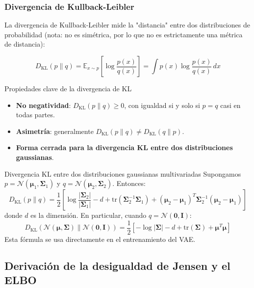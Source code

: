 \documentclass[a4paper]{article}
\begin{document}
\subsubsection{Divergencia de Kullback-Leibler}

La divergencia de Kullback-Leibler mide la "distancia" entre dos distribuciones de probabilidad (nota: no es simétrica, por lo que no es estrictamente una métrica de distancia):

$$D_{\mathrm{KL}}(p \| q) = \mathbb{E}_{x \sim p} \left[\log \frac{p(x)}{q(x)}\right] = \int p(x) \log \frac{p(x)}{q(x)} \, dx$$

\begin{importantbox}{Propiedades clave de la divergencia de KL}
\begin{itemize}
    \item \textbf{No negatividad}: $D_{\mathrm{KL}}(p \| q) \geq 0$, con igualdad si y solo si $p = q$ casi en todas partes.
    \item \textbf{Asimetría}: generalmente $D_{\mathrm{KL}}(p \| q) \neq D_{\mathrm{KL}}(q \| p)$.
    \item \textbf{Forma cerrada para la divergencia KL entre dos distribuciones gaussianas}.
\end{itemize}
\end{importantbox}

\begin{knowledgebox}{Divergencia KL entre dos distribuciones gaussianas multivariadas}
Supongamos $p = \mathcal{N}(\boldsymbol{\mu}_1, \boldsymbol{\Sigma}_1)$ y $q = \mathcal{N}(\boldsymbol{\mu}_2, \boldsymbol{\Sigma}_2)$. Entonces:
$$D_{\mathrm{KL}}(p \| q) = \frac{1}{2}\left[\log\frac{|\boldsymbol{\Sigma}_2|}{|\boldsymbol{\Sigma}_1|} - d + \mathrm{tr}(\boldsymbol{\Sigma}_2^{-1}\boldsymbol{\Sigma}_1) + (\boldsymbol{\mu}_2 - \boldsymbol{\mu}_1)^T \boldsymbol{\Sigma}_2^{-1} (\boldsymbol{\mu}_2 - \boldsymbol{\mu}_1)\right]$$
donde $d$ es la dimensión. En particular, cuando $q = \mathcal{N}(\mathbf{0}, \mathbf{I})$:
$$D_{\mathrm{KL}}(\mathcal{N}(\boldsymbol{\mu}, \boldsymbol{\Sigma}) \| \mathcal{N}(\mathbf{0}, \mathbf{I})) = \frac{1}{2}\left[-\log|\boldsymbol{\Sigma}| - d + \mathrm{tr}(\boldsymbol{\Sigma}) + \boldsymbol{\mu}^T\boldsymbol{\mu}\right]$$
Esta fórmula se usa directamente en el entrenamiento del VAE.
\end{knowledgebox}

\subsection{Derivación de la desigualdad de Jensen y el ELBO}
\end{document}
